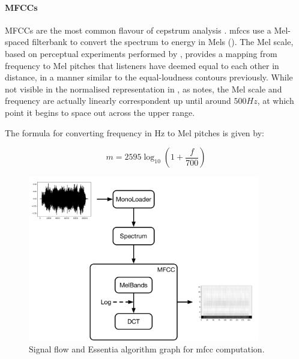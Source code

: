 {{\paragraph{MFCCs}

MFCCs are the most common flavour of cepstrum analysis \citep{Kim2006}. \acrshort{mfcc}s use a Mel-spaced filterbank to convert the spectrum to energy in Mels (). The Mel scale, based on perceptual experiments performed by \cite{Stevens1937}, provides a mapping from frequency to Mel pitches that listeners have deemed equal to each other in distance, in a manner similar to the equal-loudness contours previously. While not visible in the normalised representation in , as \cite{Kim2006} notes, the Mel scale and frequency are actually linearly correspondent up until around $500Hz$, at which point it begins to space out across the upper range.

The formula for converting frequency in Hz to Mel pitches is given by:

  \begin{equation}
	\label{eq:mel}	
	m = 2595\log_{10}(1+\frac{f}{700})
	\end{equation}
	
\begin{figure}
	\begin{center}
		\includegraphics[width=0.9\textwidth]{ch05_pyconcat/figures/mfcc_diagram.pdf}
	\end{center}
	\caption[Signal flow and Essentia algorithm graph for MFCC Computation]{Signal flow and Essentia algorithm graph for \acrshort{mfcc} computation.}
	\label{fig:mfcc_diagram}
\end{figure}	

}}
